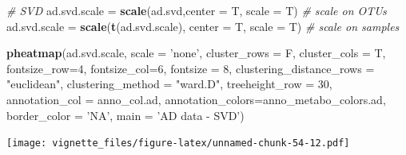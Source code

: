 \documentclass[]{book}
\newenvironment{Shaded}{\begin{snugshade}}{\end{snugshade}}
\newcommand{\KeywordTok}[1]{\textcolor[rgb]{0.13,0.29,0.53}{\textbf{#1}}}
\newcommand{\DataTypeTok}[1]{\textcolor[rgb]{0.13,0.29,0.53}{#1}}
\newcommand{\DecValTok}[1]{\textcolor[rgb]{0.00,0.00,0.81}{#1}}
\newcommand{\StringTok}[1]{\textcolor[rgb]{0.31,0.60,0.02}{#1}}
\newcommand{\CommentTok}[1]{\textcolor[rgb]{0.56,0.35,0.01}{\textit{#1}}}
\newcommand{\NormalTok}[1]{#1}
\begin{document}
\begin{Shaded}
\begin{Highlighting}[]
\CommentTok{# SVD}
\NormalTok{ad.svd.scale =}\StringTok{ }\KeywordTok{scale}\NormalTok{(ad.svd,}\DataTypeTok{center =}\NormalTok{ T, }\DataTypeTok{scale =}\NormalTok{ T) }\CommentTok{# scale on OTUs}
\NormalTok{ad.svd.scale =}\StringTok{ }\KeywordTok{scale}\NormalTok{(}\KeywordTok{t}\NormalTok{(ad.svd.scale), }\DataTypeTok{center =}\NormalTok{ T, }\DataTypeTok{scale =}\NormalTok{ T) }\CommentTok{# scale on samples}

\KeywordTok{pheatmap}\NormalTok{(ad.svd.scale, }
         \DataTypeTok{scale =} \StringTok{'none'}\NormalTok{, }
         \DataTypeTok{cluster_rows =}\NormalTok{ F, }
         \DataTypeTok{cluster_cols =}\NormalTok{ T, }
         \DataTypeTok{fontsize_row=}\DecValTok{4}\NormalTok{, }\DataTypeTok{fontsize_col=}\DecValTok{6}\NormalTok{,}
         \DataTypeTok{fontsize =} \DecValTok{8}\NormalTok{,}
         \DataTypeTok{clustering_distance_rows =} \StringTok{"euclidean"}\NormalTok{,}
         \DataTypeTok{clustering_method =} \StringTok{"ward.D"}\NormalTok{,}
         \DataTypeTok{treeheight_row =} \DecValTok{30}\NormalTok{,}
         \DataTypeTok{annotation_col =}\NormalTok{ anno_col.ad,}
         \DataTypeTok{annotation_colors=}\NormalTok{anno_metabo_colors.ad,}
         \DataTypeTok{border_color =} \StringTok{'NA'}\NormalTok{,}
         \DataTypeTok{main =} \StringTok{'AD data - SVD'}\NormalTok{)}
\end{Highlighting}
\end{Shaded}

\texttt{[image: vignette\_files/figure-latex/unnamed-chunk-54-12.pdf]}
\end{document}
